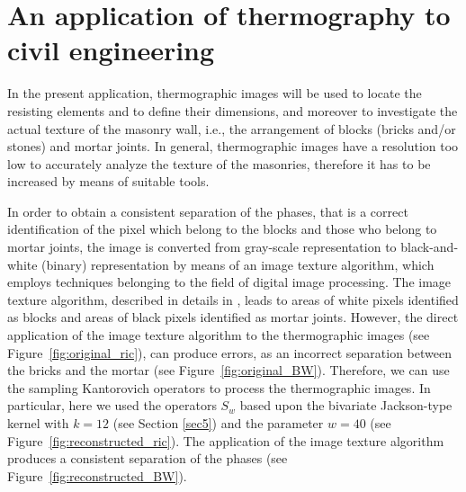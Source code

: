 \documentclass[11pt,a4paper]{article}
\begin{document}
% 
% 
% 
%
% 
% 
% 
%
% 
% 
% 

\section{An application of thermography to civil engineering}

In the present application, thermographic images will be used to locate the resisting elements and to define their dimensions, and moreover to investigate the actual texture of the masonry wall, i.e., the arrangement of blocks (bricks and/or stones) and mortar joints. 
In general, thermographic images have a resolution too low to accurately analyze  the texture of the masonries,  therefore it has to be increased by means of suitable tools.

In order to obtain a consistent separation of the phases, that is a correct identification of the pixel which belong to the blocks and those who belong to mortar joints, the image is converted from gray-scale representation to black-and-white (binary) representation by means of an image texture algorithm, which employs techniques belonging to the field of digital image processing. 
The image texture algorithm, described in details in \cite{CACLGU}, leads to areas of white pixels identified as blocks and areas of black pixels identified as mortar joints.
However, the direct application of the image texture algorithm to the thermographic images  (see Figure~\ref{fig:original_ric}), can produce errors, as an incorrect separation between the bricks and the mortar (see Figure~\ref{fig:original_BW}). 
Therefore, we can use the sampling Kantorovich operators to process the thermographic images. 
In particular, here we used the operators $S_w$ based upon the bivariate Jackson-type kernel with $k=12$ (see Section \ref{sec5}) and the parameter $w=40$ (see Figure~\ref{fig:reconstructed_ric}). 
The application of the image texture algorithm produces a consistent separation of the phases (see Figure~\ref{fig:reconstructed_BW}).
\end{document}
